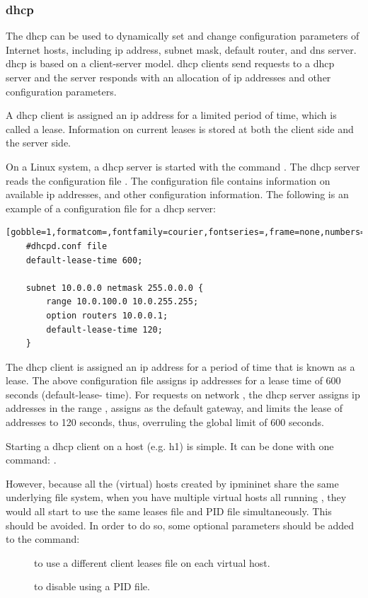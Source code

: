 \subsubsection{\acf{dhcp}}

The \acf{dhcp} can be used to dynamically set and change configuration parameters of Internet hosts, including \acs{ip} address, subnet mask, default router, and \ac{dns} server. \ac{dhcp} is based on a client-server model. \ac{dhcp} clients send requests to a \ac{dhcp} server and the server responds with an allocation of \acs{ip} addresses and other configuration parameters.

A \ac{dhcp} client is assigned an \acs{ip} address for a limited period of time, which is called a lease. Information on current leases is stored at both the client side and the server side.

On a Linux system, a \ac{dhcp} server is started with the command . The \ac{dhcp} server reads the configuration file . The configuration file contains information on available \acs{ip} addresses, and other configuration information. The following is an example of a configuration file for a \acs{dhcp} server:
\begin{framed}
\begin{Verbatim}[gobble=1,formatcom=,fontfamily=courier,fontseries=,frame=none,numbers=none]
	#dhcpd.conf file
	default-lease-time 600;
	
	subnet 10.0.0.0 netmask 255.0.0.0 {
		range 10.0.100.0 10.0.255.255; 
		option routers 10.0.0.1; 
		default-lease-time 120;
	}
\end{Verbatim}
\end{framed}

The \ac{dhcp} client is assigned an \acs{ip} address for a period of time that is known as a lease. The above configuration file assigns \acs{ip} addresses for a lease time of 600 seconds (default-lease- time). For requests on network , the \ac{dhcp} server assigns \acs{ip} addresses in the range , assigns  as the default gateway, and limits the lease of addresses to 120 seconds, thus, overruling the global limit of 600 seconds.

Starting a \ac{dhcp} client on a host (e.g. h1) is simple. It can be done with one command: .

However, because all the (virtual) hosts created by ipmininet share the same underlying file system, when you have multiple virtual hosts all running , they would all start to use the same leases file and PID file simultaneously. This should be avoided. In order to do so, some optional parameters should be added to the  command:
\begin{description}
	\item[] to use a different client leases file on each virtual host.
	\item[] to disable using a PID file.
\end{description}

